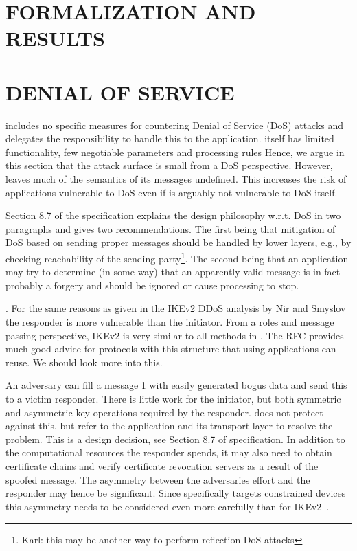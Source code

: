 \documentclass[runningheads]{llncs}
\begin{document}
\section{\uppercase{Formalization and Results}}
\label{sec:formalization}


\section{\uppercase{Denial of Service}}
\label{sec:dos}
\mEdhoc{} includes no specific measures for countering Denial of Service (DoS)
attacks and delegates the responsibility to handle this to the application.
%
\mEdhoc{} itself has limited functionality, few negotiable parameters and
processing rules
%
Hence, we argue in this section that the attack surface
is small from a DoS perspective.
%
However, \mEdhoc{} leaves much of the semantics of its messages undefined.
%
This increases the risk of applications vulnerable to DoS even if \mEdhoc{} is
arguably not vulnerable to DoS itself.
%

Section 8.7 of the \mEdhoc{} specification explains the design philosophy w.r.t.
DoS in two paragraphs and gives two recommendations.
%
The first being that mitigation of DoS based on sending proper messages should
be handled by lower layers, e.g., by checking reachability of the sending
party\footnote{Karl: this may be another way to perform reflection DoS attacks}.
%
The second being that an application may try to determine (in some way) that an
apparently valid message is in fact probably a forgery and should be ignored or
cause processing to stop.
%

.
For the same reasons as given in the IKEv2 DDoS analysis
by Nir and Smyslov~\cite{rfc8019} the responder is more vulnerable than the
initiator.
%
From a roles and message passing perspective, IKEv2 is very similar to all
methods in \mEdhoc{}.
%
The RFC provides much good advice for protocols with this structure that
\mEdhoc{} using applications can reuse.
%
We should look more into this.
%

An adversary can fill a message 1 with easily generated bogus data and send this
to a victim responder.
%
There is little work for the initiator, but both symmetric and asymmetric key
operations required by the responder.
%
\mEdhoc{} does not protect against this, but refer to the application and its
transport layer to resolve the problem.
%
This is a design decision, see Section 8.7 of \mEdhoc{} specification.
%
In addition to the computational resources the responder spends, it may also
need to obtain certificate chains and verify certificate revocation servers as a
result of the spoofed message.
%
The asymmetry between the adversaries effort and the responder may hence be
significant.
%
Since \mEdhoc{} specifically targets constrained devices this asymmetry needs to
be considered even more carefully than for IKEv2~\cite{rfc8019}.
%
\end{document}
